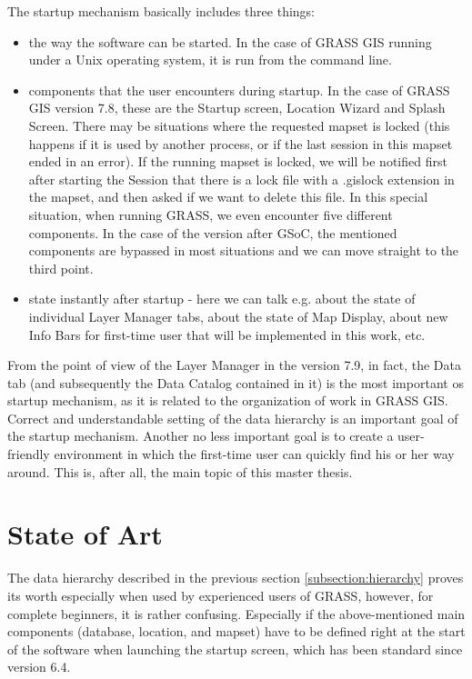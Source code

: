\documentclass[a4paper,10pt,twoside]{article}
\begin{document}
\noindent The startup mechanism basically includes three things:

\begin {itemize}

\item the way the software can be started. In the case of GRASS GIS running under a Unix operating system, it is run from the command line.

\item components that the user encounters during startup. In the case of GRASS GIS version 7.8, these are the Startup screen, Location Wizard and Splash Screen. There may be situations where the requested mapset is locked (this happens if it is used by another process, or if the last session in this mapset ended in an error). If the running mapset is locked, we will be notified first after starting the Session that there is a lock file with a .gislock extension in the mapset, and then asked if we want to delete this file. In this special situation, when running GRASS, we even encounter five different components.
In the case of the version after GSoC, the mentioned components are bypassed in most situations and we can move straight to the third point.

\item state instantly after startup - here we can talk e.g. about the state of individual Layer Manager tabs,  about the state of Map Display, about new Info Bars for first-time user that will be implemented in this work, etc. 

\end{itemize}

\noindent From the point of view of the Layer Manager in the version 7.9, in fact, the Data tab (and subsequently the Data Catalog contained in it) is the most important os startup mechanism, as it is related to the organization of work in GRASS GIS. Correct and understandable setting of the data hierarchy is an important goal of the startup mechanism. Another no less important goal is to create a user-friendly environment in which the first-time user can quickly find his or her way around. This is, after all, the main topic of this master thesis.

\newpage
\vspace*{-1cm}
\section{State of Art}
\label{State of Art}
\noindent
\large
The data hierarchy described in the previous section \ref{subsection:hierarchy} proves its worth especially when used by experienced users of GRASS, however, for complete beginners, it is rather confusing. Especially if the above-mentioned main components (database, location, and mapset) have to be defined right at the start of the software when launching the startup screen, which has been standard since version 6.4. 
\end{document}
